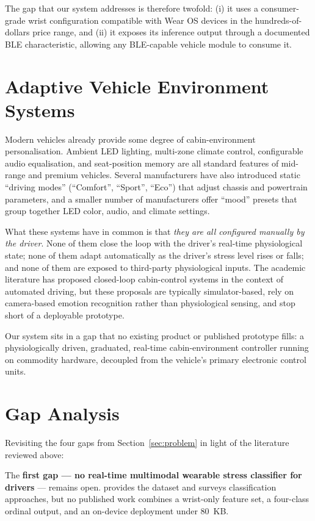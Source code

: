 The gap that our system addresses is therefore twofold: (i) it uses
a consumer-grade wrist configuration compatible with Wear OS devices
in the hundreds-of-dollars price range, and (ii) it exposes its
inference output through a documented BLE characteristic, allowing
any BLE-capable vehicle module to consume it.

\section{Adaptive Vehicle Environment Systems}
\label{sec:lit-cabin}

Modern vehicles already provide some degree of cabin-environment
personalisation. Ambient LED lighting, multi-zone climate control,
configurable audio equalisation, and seat-position memory are all
standard features of mid-range and premium vehicles. Several
manufacturers have also introduced static ``driving modes'' (``Comfort'',
``Sport'', ``Eco'') that adjust chassis and powertrain parameters, and
a smaller number of manufacturers offer ``mood'' presets that group
together LED color, audio, and climate settings.

What these systems have in common is that \emph{they are all configured
manually by the driver}. None of them close the loop with the driver's
real-time physiological state; none of them adapt automatically as the
driver's stress level rises or falls; and none of them are exposed to
third-party physiological inputs. The academic literature has proposed
closed-loop cabin-control systems in the context of automated driving,
but these proposals are typically simulator-based, rely on camera-based
emotion recognition rather than physiological sensing, and stop short
of a deployable prototype.

Our system sits in a gap that no existing product or published prototype
fills: a physiologically driven, graduated, real-time cabin-environment
controller running on commodity hardware, decoupled from the vehicle's
primary electronic control units.

\section{Gap Analysis}
\label{sec:lit-gaps}

Revisiting the four gaps from Section~\ref{sec:problem} in light of
the literature reviewed above:

The \textbf{first gap --- no real-time multimodal wearable stress
classifier for drivers} --- remains open. \citet{schmidt2018wesad}
provides the dataset and \citet{can2019stress} surveys classification
approaches, but no published work combines a wrist-only feature set,
a four-class ordinal output, and an on-device deployment under 80~KB.

